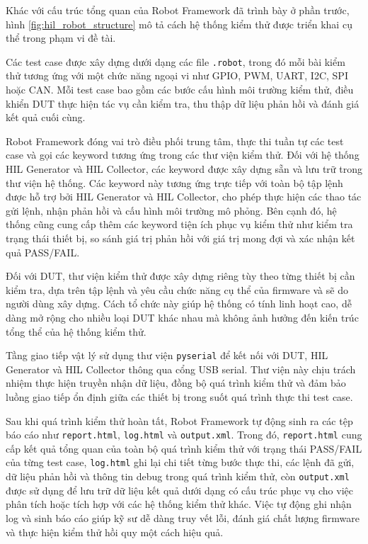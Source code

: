 Khác với cấu trúc tổng quan của Robot Framework đã trình bày ở phần trước, hình \ref{fig:hil_robot_structure} mô tả cách hệ thống kiểm thử được triển khai cụ thể trong phạm vi đề tài.

Các test case được xây dựng dưới dạng các file \texttt{.robot}, trong đó mỗi bài kiểm thử tương ứng với một chức năng ngoại vi như GPIO, PWM, UART, I2C, SPI hoặc CAN. Mỗi test case bao gồm các bước cấu hình môi trường kiểm thử, điều khiển DUT thực hiện tác vụ cần kiểm tra, thu thập dữ liệu phản hồi và đánh giá kết quả cuối cùng.

Robot Framework đóng vai trò điều phối trung tâm, thực thi tuần tự các test case và gọi các keyword tương ứng trong các thư viện kiểm thử. Đối với hệ thống HIL Generator và HIL Collector, các keyword được xây dựng sẵn và lưu trữ trong thư viện hệ thống. Các keyword này tương ứng trực tiếp với toàn bộ tập lệnh được hỗ trợ bởi HIL Generator và HIL Collector, cho phép thực hiện các thao tác gửi lệnh, nhận phản hồi và cấu hình môi trường mô phỏng. Bên cạnh đó, hệ thống cũng cung cấp thêm các keyword tiện ích phục vụ kiểm thử như kiểm tra trạng thái thiết bị, so sánh giá trị phản hồi với giá trị mong đợi và xác nhận kết quả PASS/FAIL.

Đối với DUT, thư viện kiểm thử được xây dựng riêng tùy theo từng thiết bị cần kiểm tra, dựa trên tập lệnh và yêu cầu chức năng cụ thể của firmware và sẽ do người dùng xây dựng. Cách tổ chức này giúp hệ thống có tính linh hoạt cao, dễ dàng mở rộng cho nhiều loại DUT khác nhau mà không ảnh hưởng đến kiến trúc tổng thể của hệ thống kiểm thử.

Tầng giao tiếp vật lý sử dụng thư viện \texttt{pyserial} để kết nối với DUT, HIL Generator và HIL Collector thông qua cổng USB serial. Thư viện này chịu trách nhiệm thực hiện truyền nhận dữ liệu, đồng bộ quá trình kiểm thử và đảm bảo luồng giao tiếp ổn định giữa các thiết bị trong suốt quá trình thực thi test case.

Sau khi quá trình kiểm thử hoàn tất, Robot Framework tự động sinh ra các tệp báo cáo như \texttt{report.html}, \texttt{log.html} và \texttt{output.xml}. Trong đó, \texttt{report.html} cung cấp kết quả tổng quan của toàn bộ quá trình kiểm thử với trạng thái PASS/FAIL của từng test case, \texttt{log.html} ghi lại chi tiết từng bước thực thi, các lệnh đã gửi, dữ liệu phản hồi và thông tin debug trong quá trình kiểm thử, còn \texttt{output.xml} được sử dụng để lưu trữ dữ liệu kết quả dưới dạng có cấu trúc phục vụ cho việc phân tích hoặc tích hợp với các hệ thống kiểm thử khác. Việc tự động ghi nhận log và sinh báo cáo giúp kỹ sư dễ dàng truy vết lỗi, đánh giá chất lượng firmware và thực hiện kiểm thử hồi quy một cách hiệu quả.

